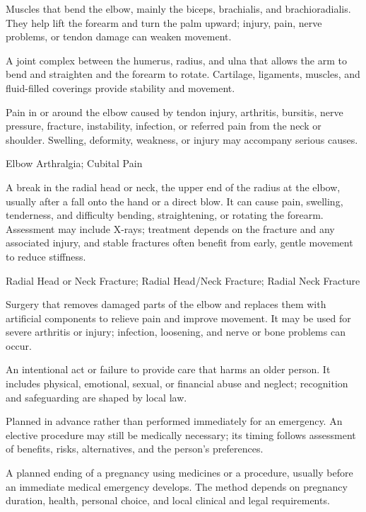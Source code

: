  Muscles that bend the elbow, mainly the biceps, brachialis, and brachioradialis. They help lift the forearm and turn the palm upward; injury, pain, nerve problems, or tendon damage can weaken movement.

 A joint complex between the humerus, radius, and ulna that allows the arm to bend and straighten and the forearm to rotate. Cartilage, ligaments, muscles, and fluid-filled coverings provide stability and movement.

 Pain in or around the elbow caused by tendon injury, arthritis, bursitis, nerve pressure, fracture, instability, infection, or referred pain from the neck or shoulder. Swelling, deformity, weakness, or injury may accompany serious causes.

\synonyms
Elbow Arthralgia; Cubital Pain

 A break in the radial head or neck, the upper end of the radius at the elbow, usually after a fall onto the hand or a direct blow. It can cause pain, swelling, tenderness, and difficulty bending, straightening, or rotating the forearm. Assessment may include X-rays; treatment depends on the fracture and any associated injury, and stable fractures often benefit from early, gentle movement to reduce stiffness.

\synonyms
Radial Head or Neck Fracture; Radial Head/Neck Fracture; Radial Neck Fracture

 Surgery that removes damaged parts of the elbow and replaces them with artificial components to relieve pain and improve movement. It may be used for severe arthritis or injury; infection, loosening, and nerve or bone problems can occur.

 An intentional act or failure to provide care that harms an older person. It includes physical, emotional, sexual, or financial abuse and neglect; recognition and safeguarding are shaped by local law.

 Planned in advance rather than performed immediately for an emergency. An elective procedure may still be medically necessary; its timing follows assessment of benefits, risks, alternatives, and the person’s preferences.

 A planned ending of a pregnancy using medicines or a procedure, usually before an immediate medical emergency develops. The method depends on pregnancy duration, health, personal choice, and local clinical and legal requirements.


